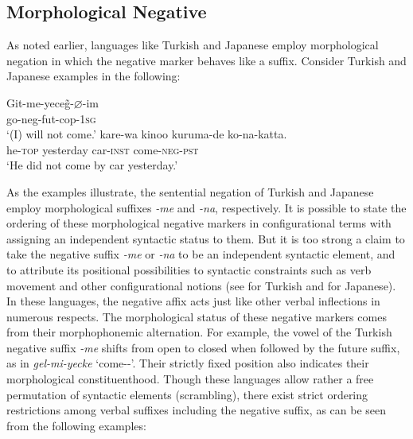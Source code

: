 \documentclass[output=paper
                ,modfonts
                		,nonflat
	        ,collection
	        ,collectionchapter
	        ,collectiontoclongg
 	        ,biblatex
                ,babelshorthands
                ,newtxmath
                ,draftmode
                ,colorlinks, citecolor=brown
]{./langsci/langscibook}
\begin{document}
{\begin{exe}
\begin{xlist}
\begin{exe}
\begin{xlist}
\section{Morphological Negative}

As noted earlier, languages like Turkish and Japanese employ morphological negation in which the negative marker behaves like a suffix. Consider
Turkish and Japanese examples in the following:

\eal
\ex
\label{turkish-jap}
\gll Git-me-yece\~{g}-$\varnothing$-im \\
     go-{\sc neg-fut-cop}-\textsc{1sg} \\
\glt `(I) will not come.'
\ex
\gll kare-wa kinoo kuruma-de ko-na-katta. \\
     he-\textsc{top} yesterday car-\textsc{inst} come-\textsc{neg}-\textsc{pst} \\
\glt `He did not come by car yesterday.'
\zl

\noindent
As the examples illustrate, the sentential negation of Turkish and Japanese employ
morphological suffixes \textit{-me} and \textit{-na},
respectively.
It is possible to state the ordering
of these morphological negative markers in configurational
terms with assigning an independent syntactic status to them.
But it is too strong a claim to
take the negative suffix \textit{-me} or \textit{-na}  to be an independent syntactic element,
and to attribute its positional possibilities to syntactic constraints
such as verb movement and other configurational notions (see \citet{kelepir} for
Turkish and \citet{Kato:97,Kato:00} for Japanese).
%
In these languages, the negative affix acts just like
other verbal inflections in numerous respects.
%
%
%
%
%
The morphological status of
these negative markers comes from their morphophonemic alternation.
For example, the vowel of the Turkish negative suffix \textit{-me} shifts from open to closed when followed by the
future suffix, as in \textit{gel-mi-yecke} `come-\NEG-\FUT'.  Their
strictly fixed position also indicates their morphological
constituenthood. Though these languages allow rather a free permutation of
syntactic elements (scrambling), there exist strict ordering restrictions among
verbal suffixes including the negative suffix, as can be seen from
the following examples:


\end{xlist}
\end{exe}
\end{xlist}
\end{exe}}
\end{document}
